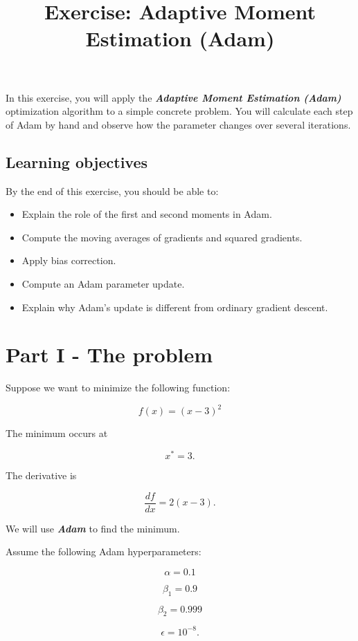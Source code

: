 \documentclass{course_sheet}
\begin{document}
\title{Exercise: Adaptive Moment Estimation (Adam)}
\author{}
\date{}
\maketitle
In this exercise, you will apply the \textbf{\textit{Adaptive Moment Estimation (Adam)}} optimization algorithm to a simple concrete problem. You will calculate each step of Adam by hand and observe how the parameter changes over several iterations.

\subsection*{Learning objectives}
By the end of this exercise, you should be able to:

\begin{itemize}
\item
Explain the role of the first and second moments in Adam.

\item
Compute the moving averages of gradients and squared gradients.

\item
Apply bias correction.

\item
Compute an Adam parameter update.

\item
Explain why Adam's update is different from ordinary gradient descent.

\end{itemize}
\clearpage
\section*{Part I - The problem}
Suppose we want to minimize the following function:

\[
f(x) = (x-3)^2
\]

The minimum occurs at

\[
x^* = 3.
\]

The derivative is

\[
\frac{df}{dx} = 2(x-3).
\]

We will use \textbf{\textit{Adam}} to find the minimum.

Assume the following Adam hyperparameters:

\[
\alpha = 0.1
\]

\[
\beta_1 = 0.9
\]

\[
\beta_2 = 0.999
\]

\[
\epsilon = 10^{-8}.
\]
\end{document}
